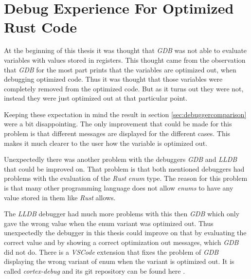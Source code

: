


\section{Debug Experience For Optimized Rust Code}
At the beginning of this thesis it was thought that \emph{GDB} was not able to evaluate variables with values stored in registers.
This thought came from the observation that \emph{GDB} for the most part prints that the variables are optimized out, when debugging optimized code.
Thus it was thought that those variables were completely removed from the optimized code.
But as it turns out they were not, instead they were just optimized out at that particular point.


Keeping these expectation in mind the result in section \ref{sec:debuggercomparison} were a bit disappointing.
The only improvement that could be made for this problem is that different messages are displayed for the different cases.
This makes it much clearer to the user how the variable is optimized out.


Unexpectedly there was another problem with the debuggers \emph{GDB} and \emph{LLDB} that could be improved on.
That problem is that both mentioned debuggers had problems with the evaluation of the \emph{Rust} \emph{enum} type.
The reason for this problem is that many other programming language does not allow \emph{enums} to have any value stored in them like \emph{Rust} allows.


The \emph{LLDB} debugger had much more problems with this then \emph{GDB} which only gave the wrong value when the enum variant was optimized out.
Thus unexpectedly the debugger in this thesis could improve on that by evaluating the correct value and by showing a correct optimization out messages, which \emph{GDB} did not do.
There is a \emph{VSCode} extension that fixes the problem of \emph{GDB} displaying the wrong variant of enum when the variant is optimized out.
It is called \emph{cortex-debug} and its git repository can be found here \cite{cortex-debug}.



